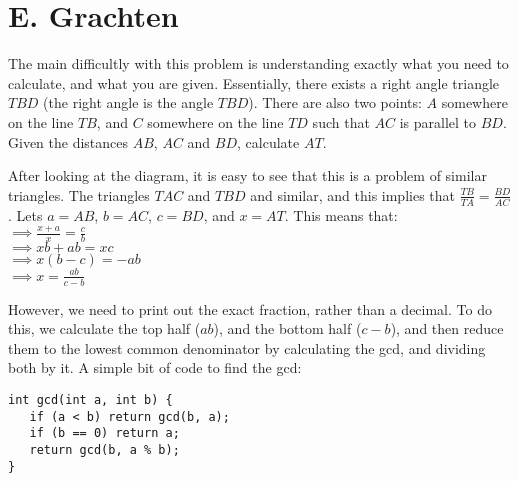 \section*{E. Grachten}

The main difficultly with this problem is understanding exactly what you need to calculate, and what you are given. Essentially, there exists a right angle triangle $TBD$ (the right angle is the angle $TBD$). There are also two points: $A$ somewhere on the line $TB$, and $C$ somewhere on the line $TD$ such that $AC$ is parallel to $BD$. Given the distances $AB$, $AC$ and $BD$, calculate $AT$.

After looking at the diagram, it is easy to see that this is a problem of similar triangles. The triangles $TAC$ and $TBD$ and similar, and this implies that $\frac{TB}{TA} = \frac{BD}{AC}$. Lets $a = AB$, $b = AC$, $c = BD$, and $x = AT$. This means that:
\\
 $\implies \frac{x + a}{x} = \frac{c}{b}$
\\
$\implies xb + ab = xc$
\\
$\implies x(b - c) = -ab$
\\
$\implies x = \frac{ab}{c - b}$

However, we need to print out the exact fraction, rather than a decimal. To do this, we calculate the top half ($ab$), and the bottom half ($c - b$), and then reduce them to the lowest common denominator by calculating the gcd, and dividing both by it. A simple bit of code to find the gcd:

\begin{verbatim}
int gcd(int a, int b) {
   if (a < b) return gcd(b, a);
   if (b == 0) return a;
   return gcd(b, a % b);
}
\end{verbatim}
